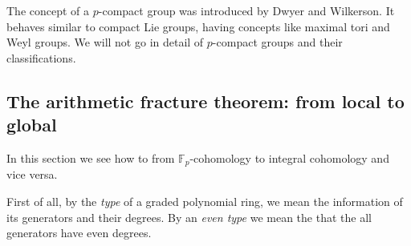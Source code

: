 \documentclass[psamsfonts]{amsart}
\theoremstyle{definition}
\newcommand{\F}{\mathbb{F}}
\numberwithin{equation}{section}
\begin{document}
The concept of a $p$-compact group was introduced by Dwyer and Wilkerson. It behaves similar to compact Lie groups, having concepts like maximal tori and Weyl groups. We will not go in detail of $p$-compact groups and their classifications.

\bigskip

\subsection{The arithmetic fracture theorem: from local to global}

In this section we see how to from $\F_p$-cohomology to integral cohomology and vice versa.\medbreak

First of all, by the \textit{type} of a graded polynomial ring, we mean the information of its generators and their degrees. By an \textit{even type} we mean the that the all generators have even degrees.
\end{document}
